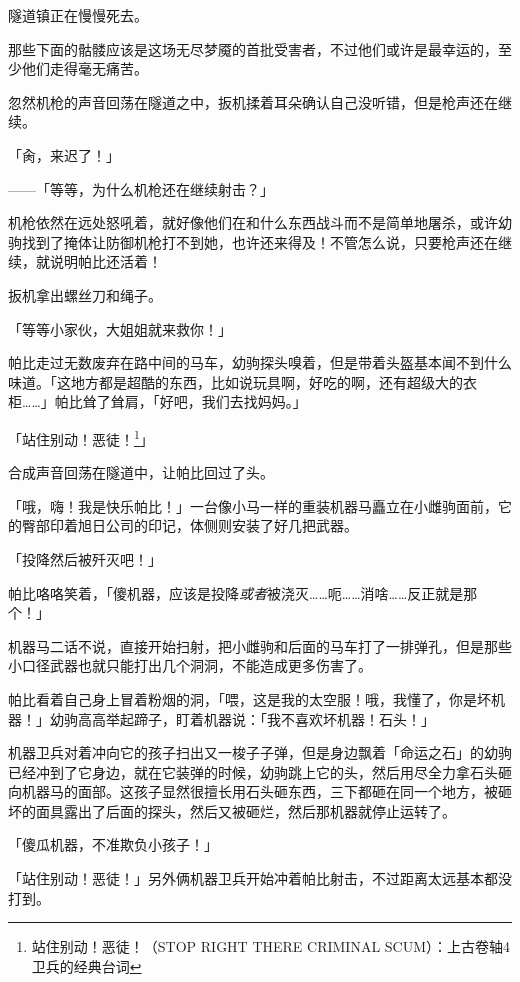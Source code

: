 隧道镇正在慢慢死去。

那些下面的骷髅应该是这场无尽梦魇的首批受害者，不过他们或许是最幸运的，至少他们走得毫无痛苦。

忽然机枪的声音回荡在隧道之中，扳机揉着耳朵确认自己没听错，但是枪声还在继续。

「肏，来迟了！」

——「等等，为什么机枪还在继续射击？」

机枪依然在远处怒吼着，就好像他们在和什么东西战斗而不是简单地屠杀，或许幼驹找到了掩体让防御机枪打不到她，也许还来得及！不管怎么说，只要枪声还在继续，就说明帕比还活着！

扳机拿出螺丝刀和绳子。

「等等小家伙，大姐姐就来救你！」

\horizonline


帕比走过无数废弃在路中间的马车，幼驹探头嗅着，但是带着头盔基本闻不到什么味道。「这地方都是超酷的东西，比如说玩具啊，好吃的啊，还有超级大的衣柜……」帕比耸了耸肩，「好吧，我们去找妈妈。」

「站住别动！恶徒！\footnotespacefix\footnote{站住别动！恶徒！（STOP RIGHT THERE CRIMINAL SCUM）：上古卷轴4卫兵的经典台词}」

合成声音回荡在隧道中，让帕比回过了头。

「哦，嗨！我是快乐帕比！」一台像小马一样的重装机器马矗立在小雌驹面前，它的臀部印着旭日公司的印记，体侧则安装了好几把武器。

「投降然后被歼灭吧！」

帕比咯咯笑着，「傻机器，应该是投降\emph{或者}被浇灭……呃……消啥……反正就是那个！」

机器马二话不说，直接开始扫射，把小雌驹和后面的马车打了一排弹孔，但是那些小口径武器也就只能打出几个洞洞，不能造成更多伤害了。

帕比看着自己身上冒着粉烟的洞，「喂，这是我的太空服！哦，我懂了，你是坏机器！」幼驹高高举起蹄子，盯着机器说：「我不喜欢坏机器！石头！」

机器卫兵对着冲向它的孩子扫出又一梭子子弹，但是身边飘着「命运之石」的幼驹已经冲到了它身边，就在它装弹的时候，幼驹跳上它的头，然后用尽全力拿石头砸向机器马的面部。这孩子显然很擅长用石头砸东西，三下都砸在同一个地方，被砸坏的面具露出了后面的探头，然后又被砸烂，然后那机器就停止运转了。

「傻瓜机器，不准欺负小孩子！」

「站住别动！恶徒！」另外俩机器卫兵开始冲着帕比射击，不过距离太远基本都没打到。

